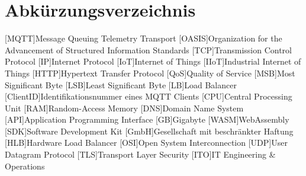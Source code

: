 

\section*{Abkürzungsverzeichnis}
\begin{acronym}[xxxxxxxxxx] %
    [MQTT]{Message Queuing Telemetry Transport}
    [OASIS]{Organization for the Advancement of Structured Information Standards}
    [TCP]{Transmission Control Protocol}
    [IP]{Internet Protocol}
    [IoT]{Internet of Things}
    [IIoT]{Industrial Internet of Things}
    [HTTP]{Hypertext Transfer Protocol}
    [QoS]{Quality of Service}
    [MSB]{Most Significant Byte}
    [LSB]{Least Significant Byte}
    [LB]{Load Balancer}
    [ClientID]{Identifikationsnummer eines MQTT Clients}
    [CPU]{Central Processing Unit}
    [RAM]{Random-Access Memory}
    [DNS]{Domain Name System}
    [API]{Application Programming Interface}
    [GB]{Gigabyte}
    [WASM]{WebAssembly}
    [SDK]{Software Development Kit}
    [GmbH]{Gesellschaft mit beschränkter Haftung}
    [HLB]{Hardware Load Balancer}
    [OSI]{Open System Interconnection}
    [UDP]{User Datagram Protocol}
    [TLS]{Transport Layer Security}
    [ITO]{IT Engineering \& Operations}
\end{acronym}
